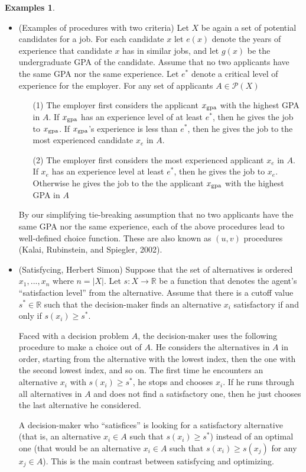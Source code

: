 \documentclass[12pt]{article}
\theoremstyle{plain}
\theoremstyle{definition}
\newtheorem{unex}[ex]{Examples}
\theoremstyle{remark}
\newcommand{\tn}[1]{\textnormal{#1}}
\newcommand{\pp}[1]{\mathcal{P}(#1)}
\newcommand{\3}{\vspace*{3mm}}
\newcommand{\RR}{\mathbb{R}}
\begin{document}
\begin{unex}
\begin{itemize}
\item (Examples of procedures with two criteria) Let $X$ be again a set of potential candidates for a job. For each candidate $x$ let $e(x)$ denote the years of experience that candidate $x$ has in similar jobs, and let $g(x)$ be the undergraduate GPA of the candidate. Assume that no two applicants have the same GPA nor the same experience. Let $e^*$ denote a critical level of experience for the employer. For any set of applicants $A \in \pp{X}$
\begin{enumerate}
\item[(1)] The employer first considers the applicant $x_{\tn{gpa}}$ with the highest GPA in $A$. If $x_{\tn{gpa}}$ has an experience level of at least $e^*$, then he gives the job to $x_{\tn{gpa}}$. If
$x_{\tn{gpa}}$’s experience is less than $e^*$, then he gives the job to the most experienced candidate $x_e$ in $A$.
\item[\tn{(2)}] The employer first considers the most experienced applicant $x_{e}$ in $A$. If $x_e$ has an experience level at least $e^*$, then he gives the job to $x_e$. Otherwise he gives the job to the the applicant $x_{\tn{gpa}}$ with the highest GPA in $A$
\end{enumerate}
By our simplifying tie-breaking assumption that no two applicants have the same GPA nor the same experience, each of the above procedures lead to well-defined choice function. These are also known as $(u, v)$ procedures (Kalai, Rubinstein, and Spiegler, 2002).

\item (Satisfycing, Herbert Simon) Suppose that the set of alternatives is ordered $x_1, . . . , x_n$ where $n = |X|$. Let $s : X \to \RR$ be a function that denotes the agent’s “satisfaction
level” from the alternative. Assume that there is a cutoff value $s^* \in \RR$ such that the decision-maker finds an alternative $x_i$ satisfactory if and only if $s(x_i) \geq s^*$. 


Faced with a decision problem $A$, the decision-maker uses the following procedure to make a choice out of $A$. He considers the alternatives in $A$ in order, starting from the alternative with the lowest index, then the one with the second lowest index, and so on. The first time he encounters an alternative $x_i$ with $s(x_i) \geq s^*$, he stops and chooses $x_i$. If he runs through all alternatives in $A$ and does not find a satisfactory one, then he just chooses the last alternative he considered. 


A decision-maker who “satisfices” is looking for a satisfactory alternative (that is, an alternative $x_i \in A$ such that $s(x_i) \geq s^*$) instead of an optimal one (that would be an alternative $x_i \in A$ such that $s(x_i) \geq s(x_j)$ for any $x_j \in A$). This is the main contrast between satisfycing and optimizing.

\end{itemize}
\end{unex}
\end{document}

